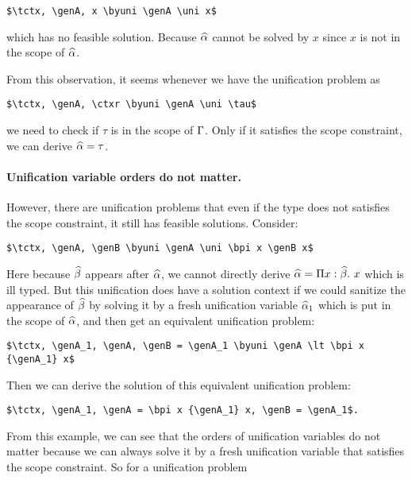 \begin{lstlisting}
$\tctx, \genA, x \byuni \genA \uni x$
\end{lstlisting}

\noindent which has no feasible solution. Because $\widehat{\alpha}$ cannot be solved by
$x$ since $x$ is not in the scope of $\widehat{\alpha}$.

From this observation, it seems whenever we have the unification problem as

\begin{lstlisting}
$\tctx, \genA, \ctxr \byuni \genA \uni \tau$
\end{lstlisting}

\noindent we need to check if $\tau$ is in the scope of $\Gamma$. Only if it
satisfies the scope constraint, we can derive $\widehat{\alpha} = \tau$.

\paragraph{Unification variable orders do not matter.}

However, there are unification problems that even if the type does not satisfies the
scope constraint, it still has feasible solutions. Consider:

\begin{lstlisting}
$\tctx, \genA, \genB \byuni \genA \uni \bpi x \genB x$
\end{lstlisting}

Here because $\widehat{\beta}$ appears after $\widehat{\alpha}$, we cannot directly derive $\widehat{\alpha} =
\Pi x:\widehat{\beta}.~ x$ which is ill typed.
But this unification does have a solution context if we could sanitize the
appearance of $\widehat{\beta}$ by solving it by a fresh unification variable $\widehat{\alpha}_1$
which is put in the scope of $\widehat{\alpha}$, and then
get an equivalent unification problem:

\begin{lstlisting}
$\tctx, \genA_1, \genA, \genB = \genA_1 \byuni \genA \lt \bpi x {\genA_1} x$
\end{lstlisting}

\noindent Then we can derive the solution of this equivalent unification problem:

\begin{lstlisting}
$\tctx, \genA_1, \genA = \bpi x {\genA_1} x, \genB = \genA_1$.
\end{lstlisting}

From this example, we can see that the orders of unification variables do not
matter because we can always solve it by a fresh unification variable that
satisfies the scope constraint. So for a unification problem

